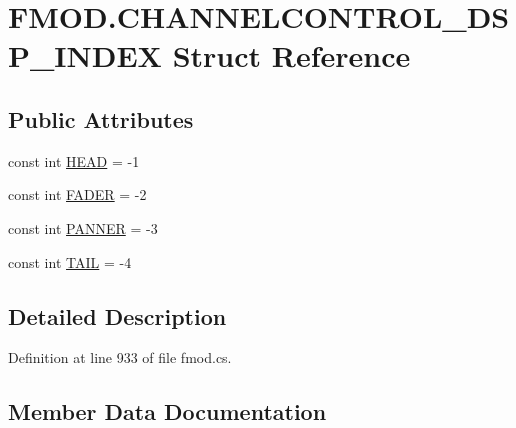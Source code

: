 \hypertarget{struct_f_m_o_d_1_1_c_h_a_n_n_e_l_c_o_n_t_r_o_l___d_s_p___i_n_d_e_x}{}\section{F\+M\+O\+D.\+C\+H\+A\+N\+N\+E\+L\+C\+O\+N\+T\+R\+O\+L\+\_\+\+D\+S\+P\+\_\+\+I\+N\+D\+EX Struct Reference}
\label{struct_f_m_o_d_1_1_c_h_a_n_n_e_l_c_o_n_t_r_o_l___d_s_p___i_n_d_e_x}
\subsection*{Public Attributes}
\begin{DoxyCompactItemize}
\item 
const int \hyperlink{struct_f_m_o_d_1_1_c_h_a_n_n_e_l_c_o_n_t_r_o_l___d_s_p___i_n_d_e_x_a3d397f9345040de262c04db6552bfd7a}{H\+E\+AD} = -\/1
\item 
const int \hyperlink{struct_f_m_o_d_1_1_c_h_a_n_n_e_l_c_o_n_t_r_o_l___d_s_p___i_n_d_e_x_a6a73b866fbb147fc468f22c8ab3c7779}{F\+A\+D\+ER} = -\/2
\item 
const int \hyperlink{struct_f_m_o_d_1_1_c_h_a_n_n_e_l_c_o_n_t_r_o_l___d_s_p___i_n_d_e_x_a4590fc1d578b4de5450548e0cd930075}{P\+A\+N\+N\+ER} = -\/3
\item 
const int \hyperlink{struct_f_m_o_d_1_1_c_h_a_n_n_e_l_c_o_n_t_r_o_l___d_s_p___i_n_d_e_x_a8cea5de168421c47b68abaaccea3622e}{T\+A\+IL} = -\/4
\end{DoxyCompactItemize}


\subsection{Detailed Description}


Definition at line 933 of file fmod.\+cs.



\subsection{Member Data Documentation}
\mbox{\label{struct_f_m_o_d_1_1_c_h_a_n_n_e_l_c_o_n_t_r_o_l___d_s_p___i_n_d_e_x_a6a73b866fbb147fc468f22c8ab3c7779}} 
